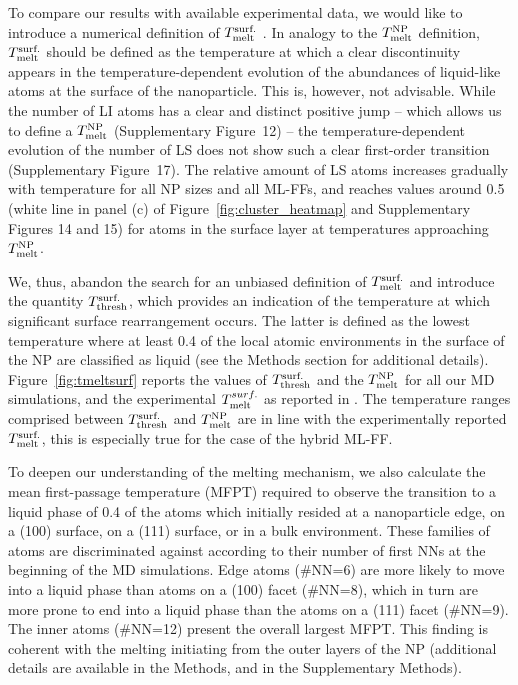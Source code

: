 \documentclass[%
aip,
 amsmath,amssymb,
 reprint,
]{revtex4-1}
\newcommand*\subt[1]{_{\textnormal{#1}}}
\newcommand*\supt[1]{^{\textnormal{#1}}}
\begin{document}
%
To compare our results with available experimental data, we would like to introduce a numerical definition of $T\supt{surf.}\subt{melt}$ .
%
In analogy to the $T\subt{melt}\supt{NP}$ definition, $T\supt{surf.}\subt{melt}$ should be defined as the temperature at which a clear discontinuity appears in the temperature-dependent evolution of the abundances of liquid-like atoms at the surface of the nanoparticle.
%
This is, however, not advisable. 
%
While the number of LI atoms has a clear and distinct positive jump -- which allows us to define a $T\subt{melt}\supt{NP}$ (Supplementary Figure~12) -- 
the temperature-dependent evolution of the number of LS does not show such a clear first-order transition (Supplementary Figure~17).
%
The relative amount of LS atoms increases gradually with temperature for all NP sizes and all ML-FFs, and reaches values around 0.5 (white line in panel (c) of Figure~\ref{fig:cluster_heatmap} and Supplementary Figures 14 and 15) for atoms in the surface layer at temperatures approaching $T\subt{melt}\supt{NP}$.
%


We, thus, abandon the search for an unbiased definition of $T\supt{surf.}\subt{melt}$ and introduce the quantity $T\supt{surf.}\subt{thresh}$, which provides an indication of the temperature at which significant surface rearrangement occurs.
%
The latter is defined as the lowest temperature where at least 0.4 of the local atomic environments in the surface of the NP are classified as liquid (see the Methods section for additional details).
%
%
Figure~\ref{fig:tmeltsurf} reports the values of $T\supt{surf.}\subt{thresh}$ and the $T\subt{melt}\supt{NP}$ for all our MD simulations, and the experimental $T\subt{melt}^{surf.}$ as reported in \citet{Foster2019}.
%
The temperature ranges comprised between $T\supt{surf.}\subt{thresh}$ and $T\subt{melt}\supt{NP}$ are in line with the experimentally reported $T\subt{melt}\supt{surf.}$, this is especially true for the case of the hybrid ML-FF.
%

To deepen our understanding of the melting mechanism, we also calculate the mean first-passage temperature (MFPT) required to observe the transition to a liquid phase of 0.4 of the atoms which initially resided at a nanoparticle edge, on a (100) surface, on a (111) surface, or in a bulk environment.
%
These families of atoms are discriminated against according to their number of first NNs at the beginning of the MD simulations.
%
Edge atoms (\#NN=6) are more likely to move into a liquid phase than atoms on a (100) facet (\#NN=8), which in turn are more prone to end into a liquid phase than the atoms on a (111) facet (\#NN=9).
%
The inner atoms (\#NN=12) present the overall largest MFPT. 
%
This finding is coherent with the melting initiating from the outer layers of the NP (additional details are available in the Methods, and in the Supplementary Methods).
%
\end{document}
